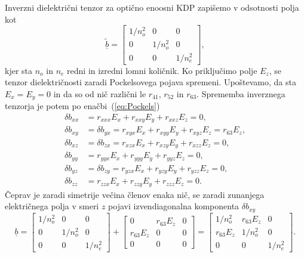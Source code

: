 Inverzni dielektrični tenzor za optično enoosni KDP zapišemo v odsotnosti polja kot
\begin{equation}
\underline{\tilde{b}} = 
\left[\begin{array}{ccc}
1/n_o^2 & 0& 0\\
0 & 1/n_o^2& 0\\
0 & 0&  1/n_e^2
\end{array}\right],
\label{7.8}
\end{equation}
kjer sta $n_o$ in $n_e$ redni in izredni lomni količnik. Ko priključimo 
polje $E_z$, se tenzor dielektričnosti zaradi Pockelsovega pojava spremeni. Upoštevamo,
da sta $E_x=E_y=0$ in da so od nič različni le $r_{41}$, $r_{52}$ in $r_{63}$. 
Sprememba inverznega tenzorja je potem po enačbi~(\ref{eq:Pockels})
\begin{align}
\delta b_{xx} & =r_{xxx}E_x + r_{xxy}E_y + r_{xxz}E_z = 0,\nonumber \\
\delta b_{xy} & = \delta b_{yx} = r_{xyx}E_x + r_{xyy}E_y + r_{xyz}E_z = r_{63}E_z,\nonumber\\
\delta b_{xz} & = \delta b_{zx} = r_{xzx}E_x + r_{xzy}E_y + r_{xzz}E_z = 0,\nonumber\\
\delta b_{yy} & = r_{yyx}E_x + r_{yyy}E_y + r_{yyz}E_z= 0,\nonumber\\
\delta b_{yz} & = \delta b_{zy} = r_{yzx}E_x + r_{yzy}E_y + r_{yzz}E_z= 0,\nonumber\\
\delta b_{zz} & = r_{zzx}E_x + r_{zzy}E_y + r_{zzz}E_z = 0.
\end{align}
Čeprav je zaradi simetrije večina členov enaka nič, se zaradi zunanjega električnega
polja v smeri $z$ pojavi izvendiagonalna komponenta $\delta b_{xy}$
\begin{equation}
\underline{b} = 
\left[\begin{array}{ccc}
1/n_o^2 & 0& 0\\
0 & 1/n_o^2 & 0\\
0 & 0& 1/n_e^2
\end{array}\right] + \left[\begin{array}{ccc}
 0& r_{63}E_z& 0\\
r_{63}E_z & 0 & 0\\
0 & 0&  0
\end{array}\right] = \left[\begin{array}{ccc}
1/n_o^2 & r_{63}E_z& 0\\
r_{63}E_z& 1/n_o^2 & 0\\
0 & 0&  1/n_e^2
\end{array}\right].
\label{7.8a}
\end{equation}
